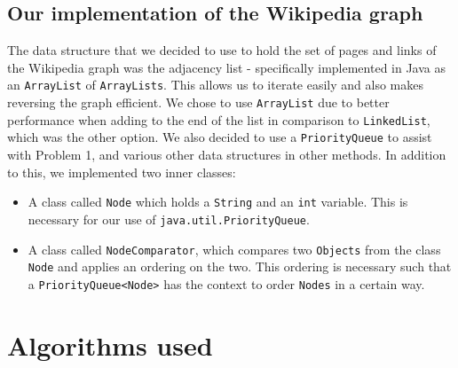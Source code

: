 \documentclass[11pt]{article}
\begin{document}
	\subsection{Our implementation of the Wikipedia graph}
	The data structure that we decided to use to hold the set of pages and links of the Wikipedia graph was the adjacency list - specifically implemented in Java as an \texttt{ArrayList} of \texttt{ArrayLists}. This allows us to iterate easily and also makes reversing the graph efficient. We chose to use \texttt{ArrayList} due to better performance when adding to the end of the list in comparison to \texttt{LinkedList}, which was the other option. We also decided to use a \texttt{PriorityQueue} to assist with Problem 1, and various other data structures in other methods. In addition to this, we implemented two inner classes:
	\begin{itemize}
		\item A class called \texttt{Node} which holds a \texttt{String} and an \texttt{int} variable. This is necessary for our use of \texttt{java.util.PriorityQueue}.
		\item A class called \texttt{NodeComparator}, which compares two \texttt{Objects} from the class \texttt{Node} and applies an ordering on the two. This ordering is necessary such that a \texttt{PriorityQueue<Node>} has the context to order \texttt{Nodes} in a certain way.
	\end{itemize}
	
	\section{Algorithms used}
\end{document}
